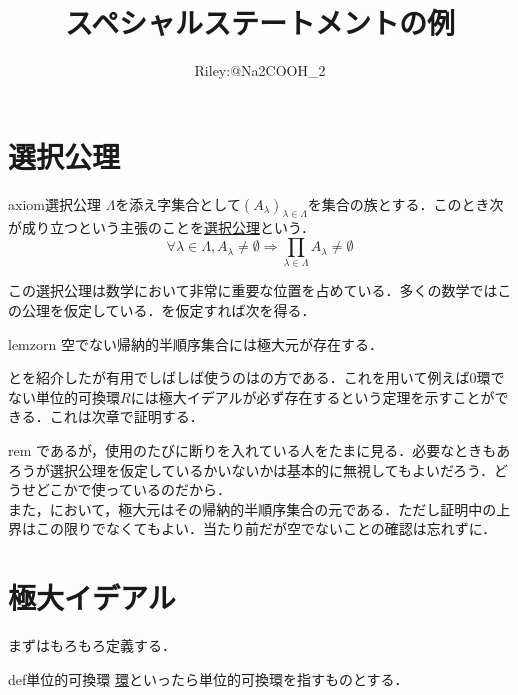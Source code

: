 \documentclass[11pt]{jsarticle}
\title{スペシャルステートメントの例}
\author{Riley:@Na2COOH\_2}
\begin{document}
\maketitle
\thispagestyle{fancy} %

\section{選択公理}
\begin{statesp}[choice]{axiom}{選択公理}
    $\Lambda$を添え字集合として$(A_{\lambda})_{\lambda \in \Lambda}$を集合の族とする．このとき次が成り立つという主張のことを\underline{選択公理}という．
    \begin{equation}
        \forall \lambda \in \Lambda, A_{\lambda} \neq \emptyset \Rightarrow \prod_{\lambda \in \Lambda}A_{\lambda} \neq \emptyset
    \end{equation}
\end{statesp}

この選択公理は数学において非常に重要な位置を占めている．多くの数学ではこの公理を仮定している．を仮定すれば次を得る．

\begin{statesp}[zorn]{lem}{zorn}
    空でない帰納的半順序集合には極大元が存在する．
\end{statesp}

とを紹介したが有用でしばしば使うのはの方である．これを用いて例えば$0$環でない単位的可換環$R$には極大イデアルが必ず存在するという定理を示すことができる．これは次章で証明する．

\begin{statesp}{rem}{}
    であるが，使用のたびに断りを入れている人をたまに見る．必要なときもあろうが選択公理を仮定しているかいないかは基本的に無視してもよいだろう．どうせどこかで使っているのだから．\\
    また，において，極大元はその帰納的半順序集合の元である．ただし証明中の上界はこの限りでなくてもよい．当たり前だが空でないことの確認は忘れずに．
\end{statesp}

\newpage

\section{極大イデアル}
まずはもろもろ定義する．
\begin{statesp}{def}{単位的可換環}
    \underline{環}といったら単位的可換環を指すものとする．
\end{statesp}
\end{document}

